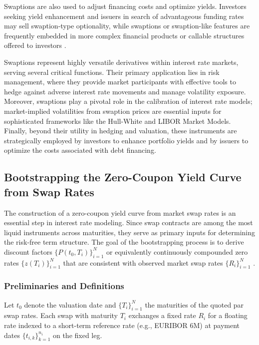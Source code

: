 Swaptions are also used to adjust financing costs and optimize yields. Investors seeking yield enhancement and issuers in search of advantageous funding rates may sell swaption-type optionality, while swaptions or swaption-like features are frequently embedded in more complex financial products or callable structures offered to investors \parencite[p.~22]{rebonato2004interest}.

Swaptions represent highly versatile derivatives within interest rate markets, serving several critical functions. Their primary application lies in risk management, where they provide market participants with effective tools to hedge against adverse interest rate movements and manage volatility exposure. Moreover, swaptions play a pivotal role in the calibration of interest rate models; market-implied volatilities from swaption prices are essential inputs for sophisticated frameworks like the Hull-White and LIBOR Market Models. Finally, beyond their utility in hedging and valuation, these instruments are strategically employed by investors to enhance portfolio yields and by issuers to optimize the costs associated with debt financing.

\subsection{Bootstrapping the Zero-Coupon Yield Curve from Swap Rates}
\label{subsec:bootstrap_zero_curve}
The construction of a zero-coupon yield curve from market swap rates is an essential step in interest rate modeling. Since swap contracts are among the most liquid instruments across maturities, they serve as primary inputs for determining the risk-free term structure. The goal of the bootstrapping process is to derive discount factors $\{P(t_0, T_i)\}_{i=1}^N$ or equivalently continuously compounded zero rates $\{z(T_i)\}_{i=1}^N$ that are consistent with observed market swap rates $\{R_i\}_{i=1}^N$ \parencite[pp.~84--86]{hull2015optionsfutures}.

\subsubsection{Preliminaries and Definitions}
Let $t_0$ denote the valuation date and $\{T_i\}_{i=1}^N$ the maturities of the quoted par swap rates. Each swap with maturity $T_i$ exchanges a fixed rate $R_i$ for a floating rate indexed to a short-term reference rate (e.g., EURIBOR 6M) at payment dates $\{t_{i,k}\}_{k=1}^{n_i}$ on the fixed leg.

